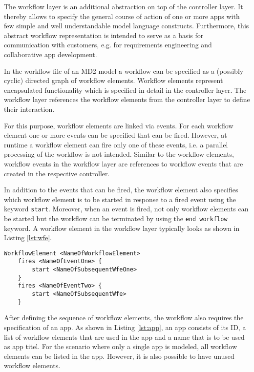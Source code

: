 
The workflow layer is an additional abstraction on top of the controller layer. It thereby allows to specify the general course of action of one or more apps with few simple and well understandable model language constructs. Furthermore, this abstract workflow representation is intended to serve as a basis for communication with customers, e.g. for requirements engineering and collaborative app development.

In the workflow file of an MD2 model a workflow can be specified as a (possibly cyclic) directed graph of workflow elements. Workflow elements represent encapsulated functionality which is specified in detail in the controller layer. The workflow layer references the workflow elements from the controller layer to define their interaction.

For this purpose, workflow elements are linked via events. For each workflow element one or more events can be specified that can be fired. However, at runtime a workflow element can fire only one of these events, i.e. a parallel processing of the workflow is not intended. Similar to the workflow elements, workflow events in the workflow layer are references to workflow events that are created in the respective controller.

In addition to the events that can be fired, the workflow element also specifies which workflow element is to be started in response to a fired event using the keyword {\lstinline!start!}. Moreover, when an event is fired, not only workflow elements can be started but the workflow can be terminated by using the \lstinline!end workflow! keyword.
A workflow element in the workflow layer typically looks as shown in Listing \ref{lst:wfe}.

\begin{lstlisting}[language=MD2, label=lst:wfe, caption=Workflow Elements in the Workflow Layer]
 WorkflowElement <NameOfWorkflowElement>
 	fires <NameOfEventOne> {
		start <NameOfSubsequentWfeOne>
	}
	fires <NameOfEventTwo> {
		start <NameOfSubsequentWfe>
	}
\end{lstlisting}

After defining the sequence of workflow elements, the workflow also requires the specification of an app. As shown in Listing \ref{lst:app}, an app consists of its ID, a list of workflow elements that are used in the app and a name that is to be used as app titel. For the scenario where only a single app is modeled, all workflow elements can be listed in the app. However, it is also possible to have unused workflow elements.

